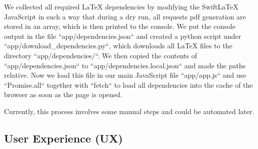 We collected all required LaTeX dependencies by modifying the SwiftLaTeX JavaScript in such a way that during a dry run,
all requests pdf generation are stored in an array, which is then printed to the console.
We put the console output in the file ``app/dependencies.json`` and created a python script under ``app/download\_dependencies.py``,
which downloads all LaTeX files to the directory ``app/dependencies/``.
We then copied the contents of ``app/dependencies.json`` to ``app/dependencies.local.json`` and made the paths relative.
Now we load this file in our main JavaScript file ``app/app.js`` and use ``Promise.all`` together with ``fetch`` to load
all dependencies into the cache of the browser as soon as the page is opened.

Currently, this process involves some manual steps and could be automated later.

\subsection{User Experience (UX)}\label{subsec:ux}
